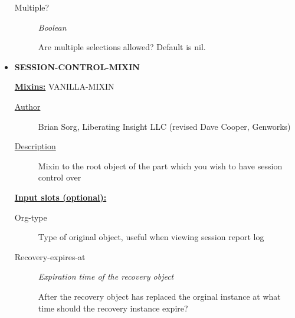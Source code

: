 \documentclass [11pt]{book}
\begin{document}
\begin{itemize}
\begin{description}
\item [Multiple?]
\emph{Boolean}

 Are multiple selections allowed? Default is nil.




\end{description}







\item {}
\label{prim:session-control-mixin}
\textbf{SESSION-CONTROL-MIXIN}


\textbf{
\underline{Mixins:}} VANILLA-MIXIN





\begin{description}

\item [
\underline{Author}]


Brian Sorg, Liberating Insight LLC (revised Dave Cooper, Genworks)



\item [
\underline{Description}]


Mixin to the root object of the part which you wish to have session control over



\end{description}








\textbf{
\underline{Input slots (optional):}}

\begin{description}

\item [Org-type]

Type of original object, useful when viewing session report log




\item [Recovery-expires-at]
\emph{Expiration time of the recovery object}

 After the recovery object has replaced the orginal
instance at what time should the recovery instance expire?





\end{description}
\end{itemize}
\end{document}
